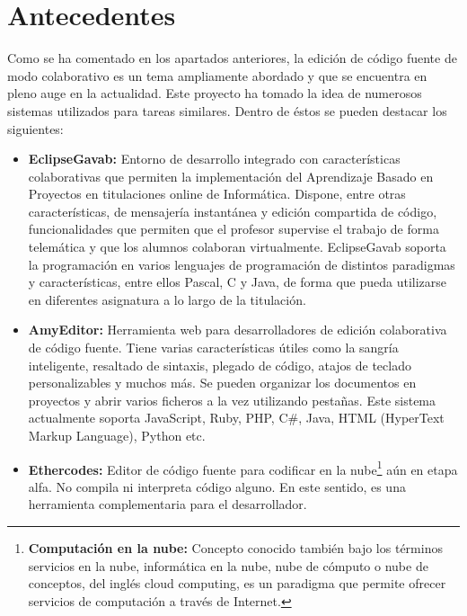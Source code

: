 \section{Antecedentes}

Como se ha comentado en los apartados anteriores, la edición de código fuente de modo colaborativo es un tema ampliamente abordado y que se encuentra en pleno auge en la actualidad. Este proyecto ha tomado la idea de numerosos sistemas utilizados para tareas similares. Dentro de éstos se pueden destacar los siguientes:

\begin{itemize}

	\item \textbf{EclipseGavab\cite{eclipsegavab}:} Entorno de desarrollo integrado con características colaborativas que permiten la implementación del Aprendizaje Basado en Proyectos en titulaciones online de Informática. Dispone, entre otras características, de mensajería instantánea y edición compartida de código, funcionalidades que permiten que el profesor supervise el trabajo de forma telemática y que los alumnos colaboran virtualmente. EclipseGavab soporta la programación en varios lenguajes de programación de distintos paradigmas y características, entre ellos Pascal, C y Java, de forma que pueda utilizarse en diferentes asignatura a lo largo de la titulación.

	\item \textbf{AmyEditor\cite{amyeditor}:} Herramienta web para desarrolladores de edición colaborativa de código fuente. Tiene varias características útiles como la sangría inteligente, resaltado de sintaxis, plegado de código, atajos de teclado personalizables y muchos más. Se pueden organizar los documentos en proyectos y abrir varios ficheros a la vez utilizando pestañas. Este sistema actualmente soporta JavaScript, Ruby, PHP, C\#, Java, HTML (HyperText Markup Language), Python etc.
	
	\item \textbf{Ethercodes\cite{ethercodes}:} Editor de código fuente para codificar en la nube\footnote{\textbf{Computación en la nube: } Concepto conocido también bajo los términos servicios en la nube, informática en la nube, nube de cómputo o nube de conceptos, del inglés cloud computing, es un paradigma que permite ofrecer servicios de computación a través de Internet.} aún en etapa alfa. No compila ni interpreta código alguno. En este sentido, es una herramienta complementaria para el desarrollador.
	

\end{itemize}
